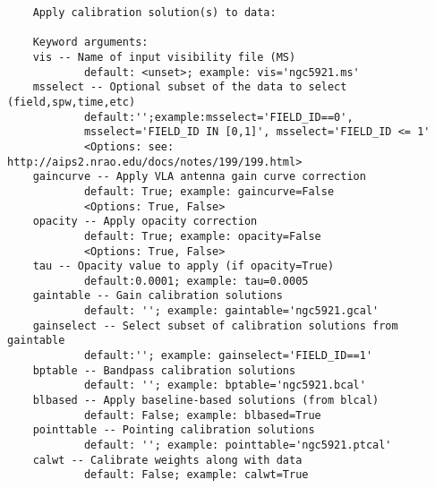 \vspace{3mm}
\small
\begin{verbatim}
    Apply calibration solution(s) to data:
    
    Keyword arguments:
    vis -- Name of input visibility file (MS)
            default: <unset>; example: vis='ngc5921.ms'
    msselect -- Optional subset of the data to select (field,spw,time,etc)
            default:'';example:msselect='FIELD_ID==0', 
            msselect='FIELD_ID IN [0,1]', msselect='FIELD_ID <= 1'
            <Options: see: http://aips2.nrao.edu/docs/notes/199/199.html>
    gaincurve -- Apply VLA antenna gain curve correction
            default: True; example: gaincurve=False
            <Options: True, False>
    opacity -- Apply opacity correction
            default: True; example: opacity=False
            <Options: True, False>
    tau -- Opacity value to apply (if opacity=True)
            default:0.0001; example: tau=0.0005
    gaintable -- Gain calibration solutions
            default: ''; example: gaintable='ngc5921.gcal'
    gainselect -- Select subset of calibration solutions from gaintable
            default:''; example: gainselect='FIELD_ID==1'
    bptable -- Bandpass calibration solutions
            default: ''; example: bptable='ngc5921.bcal'
    blbased -- Apply baseline-based solutions (from blcal)
            default: False; example: blbased=True
    pointtable -- Pointing calibration solutions
            default: ''; example: pointtable='ngc5921.ptcal'
    calwt -- Calibrate weights along with data
            default: False; example: calwt=True
\end{verbatim}
\normalsize

